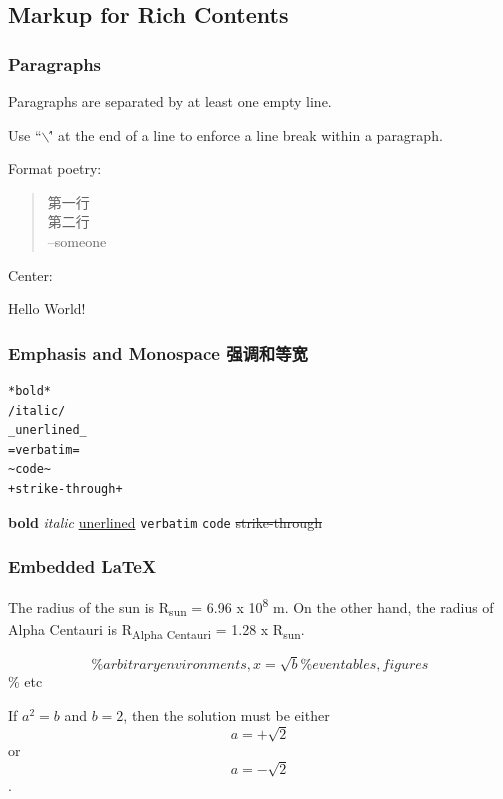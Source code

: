 \documentclass[11pt]{article}
\begin{document}
\subsection{Markup for Rich Contents}
\label{sec:org6f125f6}

\subsubsection{Paragraphs}
\label{sec:org7304d2f}
Paragraphs are separated by at least one empty line.

Use ``$\backslash$\'' at the end of a line to enforce a line break within a paragraph.

Format poetry:
\begin{verse}
第一行\\[0pt]
第二行\\[0pt]
\hspace*{4em}--someone\\[0pt]
\end{verse}

Center:
\begin{center}
Hello World!
\end{center}

\subsubsection{Emphasis and Monospace 强调和等宽}
\label{sec:orge41881d}
\begin{verbatim}
*bold*
/italic/
_unerlined_
=verbatim=
~code~
+strike-through+
\end{verbatim}

\textbf{bold}
\emph{italic}
\uline{unerlined}
\texttt{verbatim}
\texttt{code}
\sout{strike-through}

\subsubsection{Embedded \LaTeX{}}
\label{sec:org144e2f0}
The radius of the sun is R\textsubscript{sun} = 6.96 x 10\textsuperscript{8} m.  On the other hand,
the radius of Alpha Centauri is R\textsubscript{Alpha Centauri} = 1.28 x R\textsubscript{sun}.

\begin{equation}                        \% arbitrary environments,
x=\sqrt{b}                              \% even tables, figures
\end{equation}                          \% etc

If \(a^2=b\) and \(b=2\), then the solution must be
either $$ a=+\sqrt{2} $$ or \[ a=-\sqrt{2} \].
\end{document}
